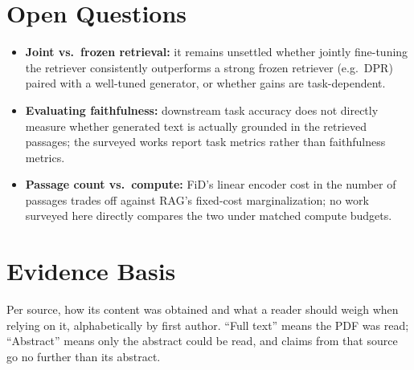\documentclass[11pt]{article}
\begin{document}
\section{Open Questions}
\begin{itemize}
  \item \textbf{Joint vs.\ frozen retrieval:} it remains unsettled whether jointly
    fine-tuning the retriever consistently outperforms a strong frozen retriever
    (e.g.\ DPR) paired with a well-tuned generator, or whether gains are
    task-dependent.
  \item \textbf{Evaluating faithfulness:} downstream task accuracy does not directly
    measure whether generated text is actually grounded in the retrieved passages;
    the surveyed works report task metrics rather than faithfulness metrics.
  \item \textbf{Passage count vs.\ compute:} FiD's linear encoder cost in the number of
    passages trades off against RAG's fixed-cost marginalization; no work surveyed
    here directly compares the two under matched compute budgets.
\end{itemize}

\section{Evidence Basis}
Per source, how its content was obtained and what a reader should weigh when relying
on it, alphabetically by first author.
``Full text'' means the PDF was read;
``Abstract'' means only the abstract could be read, and claims from that source go
no further than its abstract.
\end{document}
